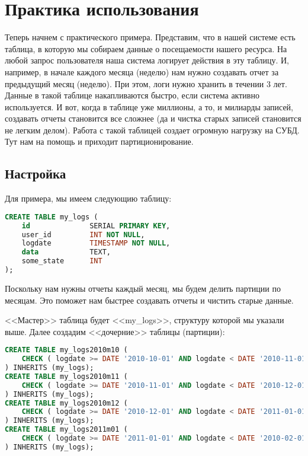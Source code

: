 \section{Практика использования}
Теперь начнем с практического примера. Представим, что в нашей системе есть таблица, в которую мы собираем данные о 
посещаемости нашего ресурса. На любой запрос пользователя наша система логирует действия в эту таблицу. 
И, например, в начале каждого месяца (неделю) нам нужно создавать отчет за предыдущий месяц (неделю). При этом, 
логи нужно хранить в течении 3 лет.
Данные в такой таблице накапливаются быстро, если система активно используется. И вот, когда в таблице уже миллионы, а то, 
и милиарды записей, создавать отчеты становится все сложнее (да и чистка старых записей становится не легким делом). 
Работа с такой таблицей создает огромную нагрузку на СУБД. 
Тут нам на помощь и приходит партиционирование.

\subsection{Настройка}
Для примера, мы имеем следующию таблицу:
\begin{lstlisting}[language=SQL,label=lst:partitioning2,caption=<<Мастер>> таблица]
CREATE TABLE my_logs (
    id              SERIAL PRIMARY KEY,
    user_id         INT NOT NULL,
    logdate         TIMESTAMP NOT NULL,
    data            TEXT,
    some_state      INT
);
\end{lstlisting}

Поскольку нам нужны отчеты каждый месяц, мы будем делить партиции по месяцам. Это поможет нам быстрее создавать 
отчеты и чистить старые данные. 

<<Мастер>> таблица будет <<my\_logs>>, структуру которой мы указали выше. Далее создадим <<дочерние>> таблицы (партиции):
\begin{lstlisting}[language=SQL,label=lst:partitioning3,caption=<<Дочерние>> таблицы]
CREATE TABLE my_logs2010m10 (
    CHECK ( logdate >= DATE '2010-10-01' AND logdate < DATE '2010-11-01' )
) INHERITS (my_logs);
CREATE TABLE my_logs2010m11 (
    CHECK ( logdate >= DATE '2010-11-01' AND logdate < DATE '2010-12-01' )
) INHERITS (my_logs);
CREATE TABLE my_logs2010m12 (
    CHECK ( logdate >= DATE '2010-12-01' AND logdate < DATE '2011-01-01' )
) INHERITS (my_logs);
CREATE TABLE my_logs2011m01 (
    CHECK ( logdate >= DATE '2011-01-01' AND logdate < DATE '2010-02-01' )
) INHERITS (my_logs);
\end{lstlisting}

